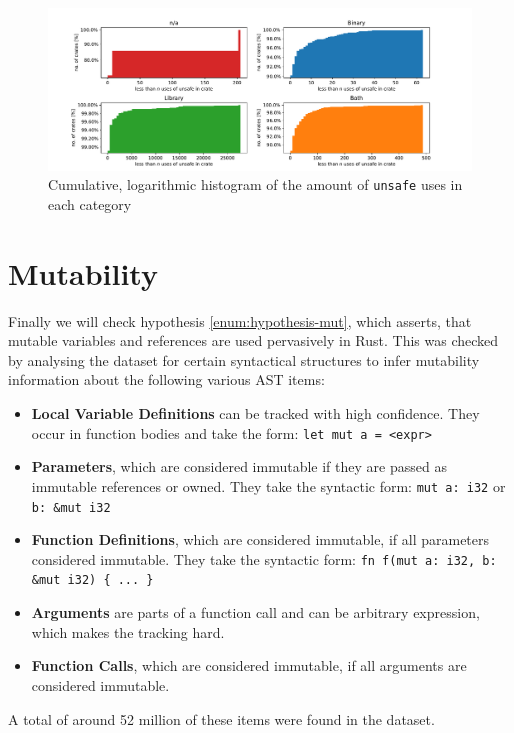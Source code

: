 \documentclass{book}
\newcommand{\code}[1]{\texttt{#1}}
\theoremstyle{definition}
\begin{document}
\begin{figure}[h]
	\centering
	\includegraphics[width=0.99\linewidth, clip, trim={0.2cm 0.2cm 0.2cm 0.2cm}]{../unsafe_counts_by_crate_type.pdf}
	\caption{Cumulative, logarithmic histogram of the amount of \code{unsafe} uses in each category}
	\label{fig:unsafe-hist}
\end{figure}


\section{Mutability}

Finally we will check hypothesis \ref{enum:hypothesis-mut}, which asserts, that mutable variables and references are used pervasively in Rust.
This was checked by analysing the dataset for certain syntactical structures to infer mutability information about the following various AST items:
\begin{itemize}
	\item \textbf{Local Variable Definitions} can be tracked with high confidence. They occur in function bodies and take the form: \code{let mut a = <expr>}
	\item \textbf{Parameters}, which are considered immutable if they are passed as immutable references or owned. They take the syntactic form: \code{mut a: i32} or \code{b: \&mut i32}
	\item \textbf{Function Definitions}, which are considered immutable, if all parameters considered immutable. They take the syntactic form: \code{fn f(mut a: i32, b: \&mut i32) \{ ... \}}
	\item \textbf{Arguments} are parts of a function call and can be arbitrary expression, which makes the tracking hard.
	\item \textbf{Function Calls}, which are considered immutable, if all arguments are considered immutable.
\end{itemize}

A total of around 52 million of these items were found in the dataset.
\end{document}
